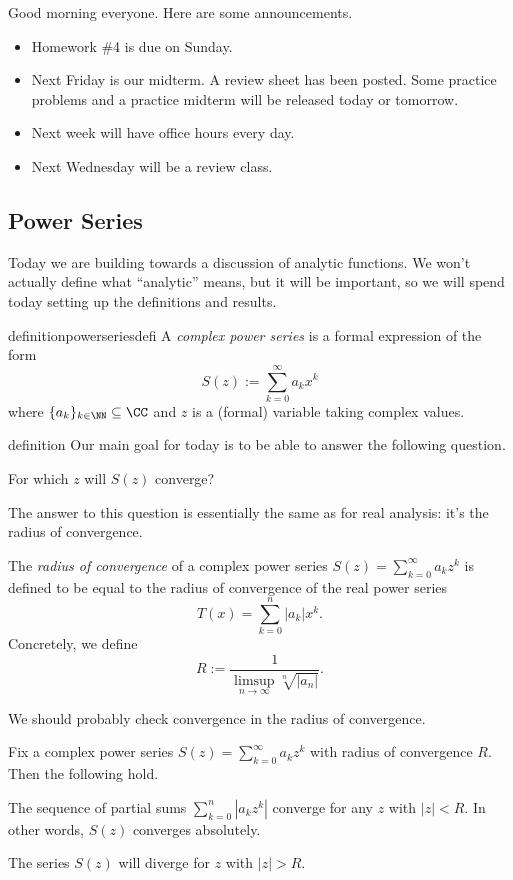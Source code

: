 
Good morning everyone. Here are some announcements.
\begin{itemize}
	\item Homework \#4 is due on Sunday.
	\item Next Friday is our midterm. A review sheet has been posted. Some practice problems and a practice midterm will be released today or tomorrow.
	\item Next week will have office hours every day.
	\item Next Wednesday will be a review class.
\end{itemize}

\subsection{Power Series}
Today we are building towards a discussion of analytic functions. We won't actually define what ``analytic'' means, but it will be important, so we will spend today setting up the definitions and results.
\begin{restatable}{definition}{powerseriesdefi}
	A \textit{complex power series} is a formal expression of the form
	\[S(z):=\sum_{k=0}^\infty a_kx^k\]
	where $\{a_k\}_{k\in\NN}\subseteq\CC$ and $z$ is a (formal) variable taking complex values.
\end{restatable}{definition}
Our main goal for today is to be able to answer the following question.
\begin{ques}
	For which $z$ will $S(z)$ converge?
\end{ques}
The answer to this question is essentially the same as for real analysis: it's the radius of convergence.
\begin{definition}
	The \textit{radius of convergence} of a complex power series $S(z)=\sum_{k=0}^\infty a_kz^k$ is defined to be equal to the radius of convergence of the real power series
	\[T(x)=\sum_{k=0}^n|a_k|x^k.\]
	Concretely, we define
	\[R:=\frac1{\limsup_{n\to\infty}\sqrt[n]{|a_n|}}.\]
\end{definition}
We should probably check convergence in the radius of convergence.
\begin{prop} \label{prop:radconverge}
	Fix a complex power series $S(z)=\sum_{k=0}^\infty a_kz^k$ with radius of convergence $R$. Then the following hold.
	\begin{listalph}
		\item The sequence of partial sums $\sum_{k=0}^n\left|a_kz^k\right|$ converge for any $z$ with $|z|<R$. In other words, $S(z)$ converges absolutely.
		\item The series $S(z)$ will diverge for $z$ with $|z|>R$.
	\end{listalph}
\end{prop}

